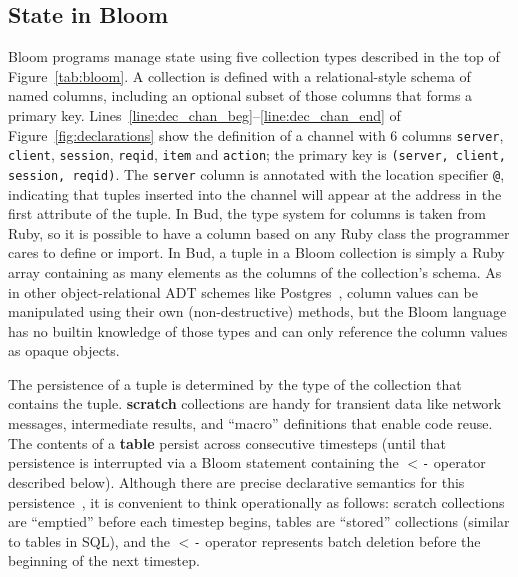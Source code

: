 \subsection{State in Bloom}
Bloom programs manage state using five collection types described in the top of
Figure~\ref{tab:bloom}. A collection is defined with a relational-style schema
of named columns, including an optional subset of those columns that forms a
primary key.  Lines~\ref{line:dec_chan_beg}--\ref{line:dec_chan_end} of
Figure~\ref{fig:declarations} show the definition of a channel with 6
columns \texttt{server}, \texttt{client}, \texttt{session}, \texttt{reqid},
\texttt{item} and \texttt{action}; the primary key is \texttt{(server, client,
  session, reqid)}. The \texttt{server} column is annotated with the location
specifier \texttt{@}, indicating that tuples inserted into the channel will
appear at the address in the first attribute of the tuple.  In Bud, the type
system for columns is taken from Ruby, so it is possible to have a column based
on any Ruby class the programmer cares to define or import.  In Bud, a tuple in
a Bloom collection is simply a Ruby array containing as many elements as the
columns of the collection's schema.  As in other object-relational ADT schemes
like Postgres~\cite{postgres-adt}, column values can be manipulated using their
own (non-destructive) methods, but the Bloom language has no builtin knowledge
of those types and can only reference the column values as opaque objects.

The persistence of a tuple is determined by the type of the collection that
contains the tuple. \textbf{scratch} collections are handy for transient data
like network messages, intermediate results, and ``macro'' definitions that
enable code reuse. The contents of a \textbf{table} persist across consecutive
timesteps (until that persistence is interrupted via a Bloom statement
containing the \texttt{$<$-} operator described below). Although there are
precise declarative semantics for this persistence~\cite{dedalus}, it is
convenient to think operationally as follows: scratch collections are
``emptied'' before each timestep begins, tables are ``stored'' collections
(similar to tables in SQL), and the \texttt{$<$-} operator represents batch
deletion before the beginning of the next timestep.

